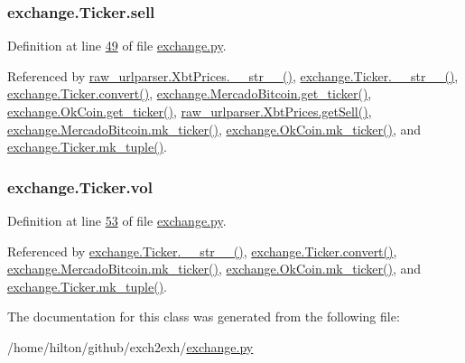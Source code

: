 \subsubsection[{\texorpdfstring{sell}{sell}}]{\setlength{\rightskip}{0pt plus 5cm}exchange.\+Ticker.\+sell}\hypertarget{classexchange_1_1_ticker_a5ba9e257d2ed28f02528a37d9ebd793e}{}\label{classexchange_1_1_ticker_a5ba9e257d2ed28f02528a37d9ebd793e}


Definition at line \hyperlink{exchange_8py_source_l00049}{49} of file \hyperlink{exchange_8py_source}{exchange.\+py}.



Referenced by \hyperlink{raw__urlparser_8py_source_l00074}{raw\+\_\+urlparser.\+Xbt\+Prices.\+\_\+\+\_\+str\+\_\+\+\_\+()}, \hyperlink{exchange_8py_source_l00099}{exchange.\+Ticker.\+\_\+\+\_\+str\+\_\+\+\_\+()}, \hyperlink{exchange_8py_source_l00055}{exchange.\+Ticker.\+convert()}, \hyperlink{exchange_8py_source_l00306}{exchange.\+Mercado\+Bitcoin.\+get\+\_\+ticker()}, \hyperlink{exchange_8py_source_l00371}{exchange.\+Ok\+Coin.\+get\+\_\+ticker()}, \hyperlink{raw__urlparser_8py_source_l00065}{raw\+\_\+urlparser.\+Xbt\+Prices.\+get\+Sell()}, \hyperlink{exchange_8py_source_l00320}{exchange.\+Mercado\+Bitcoin.\+mk\+\_\+ticker()}, \hyperlink{exchange_8py_source_l00385}{exchange.\+Ok\+Coin.\+mk\+\_\+ticker()}, and \hyperlink{exchange_8py_source_l00084}{exchange.\+Ticker.\+mk\+\_\+tuple()}.

\subsubsection[{\texorpdfstring{vol}{vol}}]{\setlength{\rightskip}{0pt plus 5cm}exchange.\+Ticker.\+vol}\hypertarget{classexchange_1_1_ticker_a24c0dd396aebc54c06e429a68c964ea3}{}\label{classexchange_1_1_ticker_a24c0dd396aebc54c06e429a68c964ea3}


Definition at line \hyperlink{exchange_8py_source_l00053}{53} of file \hyperlink{exchange_8py_source}{exchange.\+py}.



Referenced by \hyperlink{exchange_8py_source_l00099}{exchange.\+Ticker.\+\_\+\+\_\+str\+\_\+\+\_\+()}, \hyperlink{exchange_8py_source_l00055}{exchange.\+Ticker.\+convert()}, \hyperlink{exchange_8py_source_l00320}{exchange.\+Mercado\+Bitcoin.\+mk\+\_\+ticker()}, \hyperlink{exchange_8py_source_l00385}{exchange.\+Ok\+Coin.\+mk\+\_\+ticker()}, and \hyperlink{exchange_8py_source_l00084}{exchange.\+Ticker.\+mk\+\_\+tuple()}.



The documentation for this class was generated from the following file\+:\begin{DoxyCompactItemize}
\item 
/home/hilton/github/exch2exh/\hyperlink{exchange_8py}{exchange.\+py}\end{DoxyCompactItemize}
